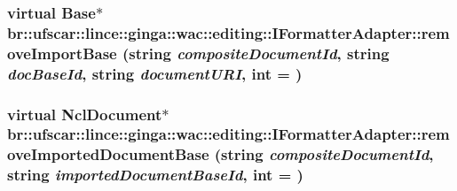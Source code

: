 \label{classbr_1_1ufscar_1_1lince_1_1ginga_1_1wac_1_1editing_1_1IFormatterAdapter_a1f4faecc413a705202b50da30cb2c17b}
\hypertarget{classbr_1_1ufscar_1_1lince_1_1ginga_1_1wac_1_1editing_1_1IFormatterAdapter_a5c6797efc83b486a3dee998fce3d9c88}{
\subsubsection[{removeImportBase}]{\setlength{\rightskip}{0pt plus 5cm}virtual Base$\ast$ br::ufscar::lince::ginga::wac::editing::IFormatterAdapter::removeImportBase (string {\em compositeDocumentId}, \/  string {\em docBaseId}, \/  string {\em documentURI}, \/  int = {})}}
\label{classbr_1_1ufscar_1_1lince_1_1ginga_1_1wac_1_1editing_1_1IFormatterAdapter_a5c6797efc83b486a3dee998fce3d9c88}
\hypertarget{classbr_1_1ufscar_1_1lince_1_1ginga_1_1wac_1_1editing_1_1IFormatterAdapter_ad001bfa641609f9fc6e4b30396229c9f}{
\subsubsection[{removeImportedDocumentBase}]{\setlength{\rightskip}{0pt plus 5cm}virtual NclDocument$\ast$ br::ufscar::lince::ginga::wac::editing::IFormatterAdapter::removeImportedDocumentBase (string {\em compositeDocumentId}, \/  string {\em importedDocumentBaseId}, \/  int = {})}}
\label{classbr_1_1ufscar_1_1lince_1_1ginga_1_1wac_1_1editing_1_1IFormatterAdapter_ad001bfa641609f9fc6e4b30396229c9f}
